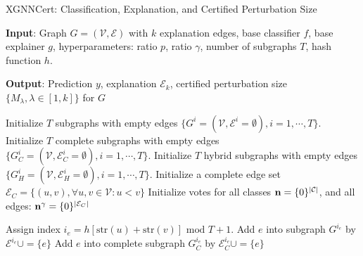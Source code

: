 \begin{algorithm}[!t] 
\small
\caption{XGNNCert: Classification, Explanation, and Certified Perturbation Size}
\label{alg:algorithm1}
\textbf{Input}: Graph $G={(\mathcal{V},\mathcal{E})}$ with $k$  explanation edges,  base classifier $f$, base explainer $g$, 
hyperparameters: ratio $p$, ratio $\gamma$, number of subgraphs $T$, hash function $h$.

\textbf{Output}: Prediction $y$, explanation $\mathcal{E}_{k}$, certified perturbation size $\{{  M_\lambda},\lambda\in[1,k]\}$ for $G$


\begin{algorithmic}[1] %
\STATE Initialize $T$ subgraphs with empty edges $\{G^{i}=(\mathcal{V},\mathcal{E}^{i}=\emptyset),i=1,\cdots,T\}$.
\STATE Initialize $T$ complete subgraphs with empty edges $\{G^{i}_{C}=(\mathcal{V},\mathcal{E}^{i}_{C}=\emptyset),i=1,\cdots,T\}$.
\STATE Initialize $T$ hybrid subgraphs with empty edges $\{G^{i}_{H}=(\mathcal{V},\mathcal{E}^{i}_{H}=\emptyset),i=1,\cdots,T\}$.
\STATE Initialize a complete edge set $\mathcal{E}_{C} = \{(u,v),\forall u,v\in\mathcal{V}:u<v\}$
\STATE Initialize votes for all classes ${\bf n}= \{0\}^{|\mathcal{C}|}$, and all edges: ${\bf n}^{\gamma}= \{0\}^{|\mathcal{E}_{C}|}$

\STATE Assign index $i_e = h[\mathrm{str}(u) + \mathrm{str}(v)] \, \, \mathrm{mod} \, \, T+1.$
\STATE Add $e$ into subgraph 
$G^{i_{e}}$ by $\mathcal{E}^{i_{e}}\cup= \{e\}$
\ENDIF
\STATE Add $e$ into complete subgraph  $G^{i_{e}}_{C}$ by $\mathcal{E}^{i_{e}}_{C}\cup=\{e\}$
\ENDFOR


\end{algorithmic}
\end{algorithm}

